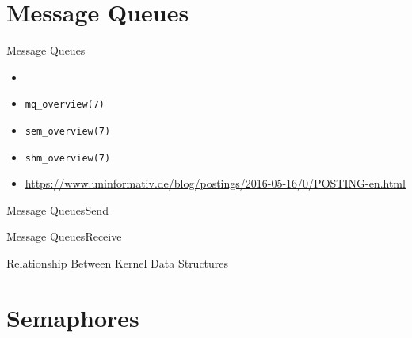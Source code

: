 \section{Message Queues}
\label{sec:message-queues}

\begin{frame}{Message Queues}
  \centering%
  \begin{minipage}{.2\linewidth}
  \end{minipage}\qquad
  \begin{minipage}{.3\linewidth}
  \end{minipage}
\end{frame}

\begin{itemize}
\item {}
\item \texttt{mq\_overview(7)}
\item \texttt{sem\_overview(7)}
\item \texttt{shm\_overview(7)}
\item \url{https://www.uninformativ.de/blog/postings/2016-05-16/0/POSTING-en.html}
\end{itemize}

\begin{frame}{Message Queues}{Send}
  \centering
\end{frame}

\begin{frame}{Message Queues}{Receive}
  \centering
\end{frame}

\begin{frame}{Relationship Between Kernel Data Structures}
\begin{center}
\end{center}
\end{frame}

\section{Semaphores}
\label{sec:semaphores}

